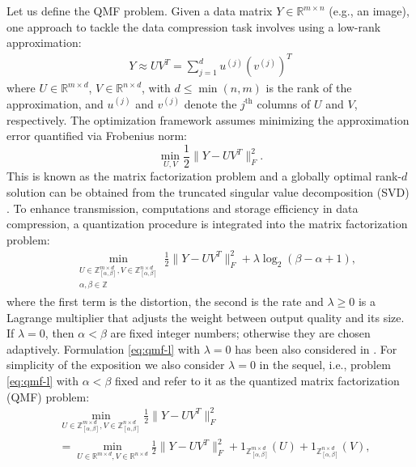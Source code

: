 \documentclass[lettersize,journal]{IEEEtran}
\begin{document}
\noindent Let us define the QMF problem. Given a data matrix $Y \in \mathbb{R}^{m \times n}$ (e.g., an image),  one approach to tackle the data compression task involves using a low-rank approximation:
\begin{align*}
    Y \approx UV^T = \sum_{j=1}^{d} u^{(j)}\left(v^{(j)}\right)^T 
\end{align*}
where $U \in \mathbb{R}^{m \times d}$, $V \in \mathbb{R}^{n \times d}$, with $d\leq \min(n,m)$ is the rank of the approximation,   and  $u^{(j)}$ and  $v^{(j)}$  denote the  $j^{\text{th}}$ columns of $U$ and $V$, respectively.  The optimization framework assumes minimizing the approximation error quantified via Frobenius norm: 
$$ \min_{U,V} \frac{1}{2}\| Y - UV^T\|^2_F.$$ This is  known as the matrix factorization problem and a globally optimal rank-\(d\) solution can be obtained from the truncated singular value decomposition  (SVD) \cite{eckart1936approximation}. To enhance  transmission, computations and storage efficiency in data compression, a quantization procedure is integrated into the matrix factorization problem: 
\begin{align}
	\label{eq:qmf-l}
	&\!\!\!\!  \min_{ \substack{ U \in \mathbb{Z}_{[\alpha,\beta]}^{m \times d}, V \in \mathbb{Z}_{[\alpha,\beta]}^{n \times d} \\  \alpha, \beta \in \mathbb{Z}}} \frac{1}{2} \| Y - UV^T\|_{F}^{2}  +  \lambda  \log_2(\beta -\alpha +1),
\end{align}
where  the first term  is the distortion, the second is  the rate and  $\lambda \geq 0$ is a Lagrange multiplier that adjusts the weight between output quality and its size. If  $\lambda = 0$, then   $\alpha<\beta$ are fixed integer numbers;  otherwise they are  chosen adaptively.  Formulation 	\eqref{eq:qmf-l} with $\lambda=0$ has been also considered in  \cite{Fre:14, qmf}.  For simplicity of the exposition we also consider  $\lambda=0$ in the sequel, i.e.,  problem  \eqref{eq:qmf-l} with $\alpha<\beta$ fixed and refer to it as the quantized matrix factorization (QMF) problem:
\begin{align}
\label{eq:qmf}
& \min_{ U \in \mathbb{Z}_{[\alpha,\beta]}^{m \times d}, V \in \mathbb{Z}_{[\alpha,\beta]}^{n \times d}} \frac{1}{2} \| Y - UV^T\|_{F}^{2} \\
& =\!\!\!\min_{ U \in \mathbb{R}^{m \times d}, V \in \mathbb{R}^{n \times d}} \! \frac{1}{2} \| Y - UV^T\|_{F}^{2}  + 1_{ \mathbb{Z}_{[\alpha,\beta]}^{m \times d}} (U) + 1_{\mathbb{Z}_{[\alpha,\beta]}^{n \times d}}(V),  \nonumber 
\end{align}
\end{document}
